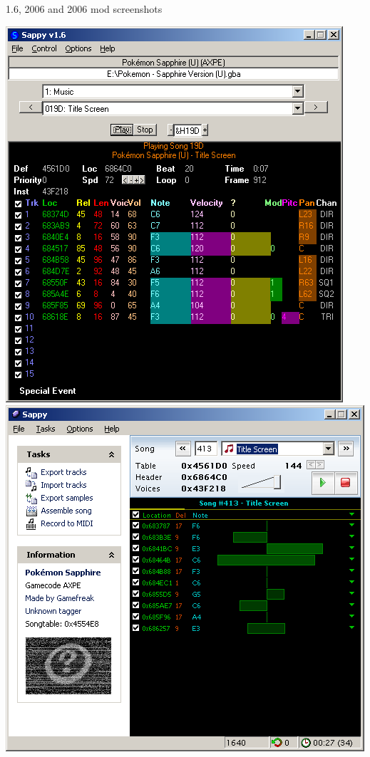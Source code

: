 \documentclass[
]{book}
\begin{document}
1.6, 2006 and 2006 mod screenshots

\includegraphics{images/163_home_fast6191_romhackingguide_unrenamed_fil____original_borders_romhackingguidesappy1_6_1.png}\includegraphics{images/164_home_fast6191_romhackingguide_unrenamed_fil___original_borders_romhackingguidesappy2006_1.png}
\end{document}
